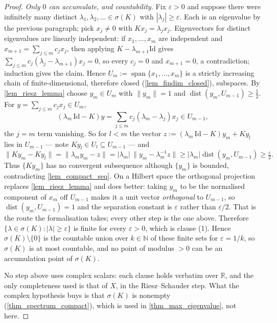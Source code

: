 \documentclass[a4paper]{report}
\theoremstyle{plain}
\theoremstyle{definition}
\theoremstyle{remark}
\begin{document}
\begin{proof}
  \emph{Only $0$ can accumulate, and countability.}
  Fix $\varepsilon > 0$ and suppose
  there were infinitely many distinct $\lambda_1,\lambda_2,\dots \in \sigma(K)$ with
  $|\lambda_j| \ge \varepsilon$.  Each is an eigenvalue by the previous paragraph; pick
  $x_j \ne 0$ with $Kx_j = \lambda_jx_j$.  Eigenvectors for distinct eigenvalues are
  linearly independent: if $x_1,\dots,x_m$ are independent and
  $x_{m+1} = \sum_{j\le m}c_jx_j$, then applying $K-\lambda_{m+1}\mathrm{Id}$ gives
  $\sum_{j\le m}c_j(\lambda_j-\lambda_{m+1})x_j = 0$, so every $c_j = 0$ and $x_{m+1} = 0$,
  a contradiction; induction gives the claim.  Hence
  $U_m := \operatorname{span}\{x_1,\dots,x_m\}$ is a strictly increasing chain of
  finite-dimensional, therefore closed (\cref{lem_findim_closed}), subspaces.  By
  \cref{lem_riesz_lemma} choose $y_m \in U_m$ with $\|y_m\| = 1$ and
  $\operatorname{dist}(y_m,U_{m-1}) \ge \tfrac12$.  For $y = \sum_{j\le m}c_jx_j \in U_m$,
  \[
    (\lambda_m\,\mathrm{Id}-K)y = \sum_{j\le m}c_j(\lambda_m-\lambda_j)x_j \in U_{m-1},
  \]
  the $j = m$ term vanishing.  So for $l < m$ the vector
  $z := (\lambda_m\,\mathrm{Id}-K)y_m + Ky_l$ lies in $U_{m-1}$ --- note
  $Ky_l \in U_l \subseteq U_{m-1}$ --- and
  \[
    \|Ky_m - Ky_l\| = \|\lambda_my_m - z\|
      = |\lambda_m|\,\bigl\|y_m - \lambda_m^{-1}z\bigr\|
      \ge |\lambda_m|\operatorname{dist}(y_m,U_{m-1}) \ge \tfrac{\varepsilon}{2} .
  \]
  Thus $\{Ky_m\}$ has no convergent subsequence although $\{y_m\}$ is bounded,
  contradicting \cref{lem_compact_seq}.  On a Hilbert space the orthogonal projection
  replaces \cref{lem_riesz_lemma} and does better: taking $y_m$ to be the normalised
  component of $x_m$ off $U_{m-1}$ makes it a unit vector \emph{orthogonal} to
  $U_{m-1}$, so $\operatorname{dist}(y_m,U_{m-1}) = 1$ and the separation constant is
  $\varepsilon$ rather than $\varepsilon/2$.  That is the route the formalisation takes;
  every other step is the one above.  Therefore
  $\{\lambda \in \sigma(K) : |\lambda| \ge \varepsilon\}$ is finite for every
  $\varepsilon > 0$, which is clause (1).  Hence $\sigma(K)\setminus\{0\}$ is the countable union over
  $k \in \mathbb{N}$ of these finite sets for $\varepsilon = 1/k$, so $\sigma(K)$ is at
  most countable, and no point of modulus $> 0$ can be an accumulation point of
  $\sigma(K)$.

  No step above uses complex scalars: each clause holds verbatim over $\mathbb{R}$, and the
  only completeness used is that of $X$, in the Riesz--Schauder step.  What the complex
  hypothesis buys is that $\sigma(K)$ is nonempty (\cref{thm_spectrum_compact}), which is
  used in \cref{thm_max_eigenvalue}, not here.
\end{proof}
\end{document}
